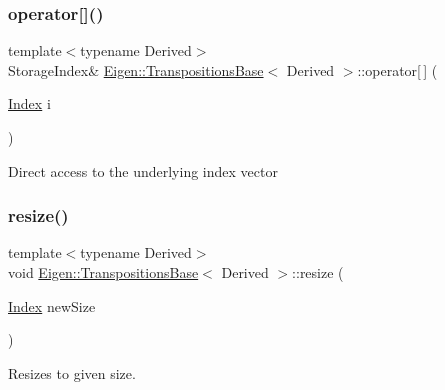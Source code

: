 \subsubsection{\texorpdfstring{operator[]()}{operator[]()}\hspace{0.1cm}{\footnotesize\ttfamily [2/2]}}
{\footnotesize\ttfamily template$<$typename Derived$>$ \\
Storage\+Index\& \mbox{\hyperlink{class_eigen_1_1_transpositions_base}{Eigen\+::\+Transpositions\+Base}}$<$ Derived $>$\+::operator\mbox{[}$\,$\mbox{]} (\begin{DoxyParamCaption}\item[{\mbox{\hyperlink{class_eigen_1_1_transpositions_base_a3f5f06118b419e8e6ccbe49ed5b4c91f}{Index}}}]{i }\end{DoxyParamCaption})\hspace{0.3cm}{\ttfamily [inline]}}

Direct access to the underlying index vector \mbox{\label{class_eigen_1_1_transpositions_base_a3dfa713d74fc1f9a7e589b3d428f7849}} 
\subsubsection{\texorpdfstring{resize()}{resize()}}
{\footnotesize\ttfamily template$<$typename Derived$>$ \\
void \mbox{\hyperlink{class_eigen_1_1_transpositions_base}{Eigen\+::\+Transpositions\+Base}}$<$ Derived $>$\+::resize (\begin{DoxyParamCaption}\item[{\mbox{\hyperlink{class_eigen_1_1_transpositions_base_a3f5f06118b419e8e6ccbe49ed5b4c91f}{Index}}}]{new\+Size }\end{DoxyParamCaption})\hspace{0.3cm}{\ttfamily [inline]}}

Resizes to given size. \mbox{\label{class_eigen_1_1_transpositions_base_a8c073f17542a8fc9ac581c17f6cdc8d3}} 
